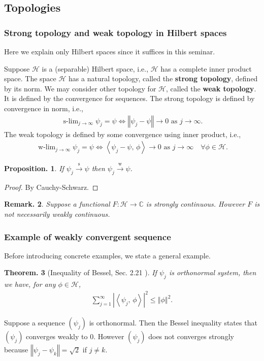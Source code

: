 \documentclass[openany, a4paper, oneside]{jsbook}
\DeclareMathOperator*{\slim}{s-lim}
\DeclareMathOperator*{\wlim}{w-lim}
\theoremstyle{break}
\newtheorem{thm}{Theorem.}[section]
\newtheorem{prop}[thm]{Proposition.}
\theoremstyle{breakdefn}
\newtheorem{rem}[thm]{Remark.}
\newcommand{\abs}[1]{\left|#1\right|}
\newcommand{\norm}[1]{\left\Vert#1\right\Vert}
\newcommand{\bkt}[2]{\left\langle#1,\,#2\right\rangle}
\newcommand{\bbC}{\mathbb{C}}
\newcommand{\calH}{\mathcal{H}}
\newcommand{\sto}{\xrightarrow{\text{s}}}
\newcommand{\wto}{\xrightarrow{\text{w}}}
\begin{document}
\subsection{Topologies \label{Lieb-Loss_Analysis_chap11_36}}

\subsubsection{Strong topology and weak topology in Hilbert spaces}


Here we explain only Hilbert spaces since it suffices in this seminar.

Suppose $\calH$ is a (separable) Hilbert space, i.e., $\calH$ has a complete inner product space.
The space $\calH$ has a natural topology, called the \textbf{strong topology}, defined by its norm.
We may consider other topology for $\calH$, called the \textbf{weak topology}.
It is defined by the convergence for sequences.
The strong topology is defined by convergence in norm, i.e.,
\begin{align}
 \slim_{j \to \infty} \psi_j = \psi
 \Longleftrightarrow
 \norm{\psi_j - \psi} \to 0 \text{ as } j \to \infty.
\end{align}
The weak topology is defined by some convergence using inner product, i.e.,
\begin{align}
 \wlim_{j \to \infty} \psi_j = \psi
 \Longleftrightarrow
 \bkt{\psi_j - \psi}{\phi} \to 0 \text{ as } j \to \infty \quad \forall \phi \in \calH.
\end{align}
\begin{prop}
 If $\psi_j \sto \psi$ then $\psi_j \wto \psi$.
\end{prop}
\begin{proof}
By Cauchy-Schwarz.
\end{proof}
\begin{rem}
 Suppose a functional $F \colon \calH \to \bbC$ is strongly continuous.
 However $F$ is not necessarily weakly continuous.
\end{rem}
\subsubsection{Example of weakly convergent sequence}


Before introducing concrete examples, we state a general example.
\begin{thm}[Inequality of Bessel, Sec. 2.21 \cite{LiebLoss1}]
 If $\psi_j$ is orthonormal system, then we have, for any $\phi \in \calH$,
 \begin{align}
  \sum_{j = 1}^{\infty} \abs{\bkt{\psi_j}{\phi}}^2
  \leq
  \norm{\phi}^2.
 \end{align}
\end{thm}
Suppose a sequence $(\psi_j)$ is orthonormal.
Then the Bessel inequality states that $(\psi_j)$ converges weakly to 0.
However $(\psi_j)$ does not converges strongly because $\norm{\psi_j - \psi_k} = \sqrt{2}$ if $j \neq k$.
\end{document}
